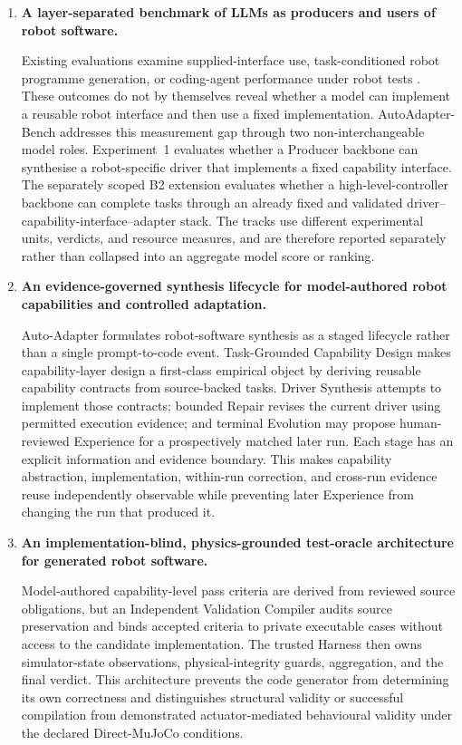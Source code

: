 \begin{enumerate}[leftmargin=*,itemsep=0.8em]

  \item \textbf{A layer-separated benchmark of LLMs as producers and users of
  robot software.}

  Existing evaluations examine supplied-interface use, task-conditioned robot
  programme generation, or coding-agent performance under robot tests
  \citep{liang2023codeaspolicies,hu2024codebotler,fu2026capx}. These outcomes do
  not by themselves reveal whether a model can implement a reusable robot
  interface and then use a fixed implementation. AutoAdapter-Bench addresses
  this measurement gap through two non-interchangeable model roles.
  Experiment~1 evaluates whether a Producer backbone can synthesise a
  robot-specific driver that implements a fixed capability interface. The
  separately scoped B2 extension evaluates whether a high-level-controller
  backbone can complete tasks through an already fixed and validated
  driver--capability-interface--adapter stack. The tracks use different
  experimental units, verdicts, and resource measures, and are therefore
  reported separately rather than collapsed into an aggregate model score or
  ranking.

  \item \textbf{An evidence-governed synthesis lifecycle for model-authored
  robot capabilities and controlled adaptation.}

  Auto-Adapter formulates robot-software synthesis as a staged lifecycle rather
  than a single prompt-to-code event. Task-Grounded Capability Design makes
  capability-layer design a first-class empirical object by deriving reusable
  capability contracts from source-backed tasks. Driver Synthesis attempts to
  implement those contracts; bounded Repair revises the current driver using
  permitted execution evidence; and terminal Evolution may propose
  human-reviewed Experience for a prospectively matched later run. Each stage
  has an explicit information and evidence boundary. This makes capability
  abstraction, implementation, within-run correction, and cross-run evidence
  reuse independently observable while preventing later Experience from
  changing the run that produced it.

  \item \textbf{An implementation-blind, physics-grounded test-oracle
  architecture for generated robot software.}

  Model-authored capability-level pass criteria are derived from reviewed
  source obligations, but an Independent Validation Compiler audits source
  preservation and binds accepted criteria to private executable cases without
  access to the candidate implementation. The trusted Harness then owns
  simulator-state observations, physical-integrity guards, aggregation, and the
  final verdict. This architecture prevents the code generator from determining
  its own correctness and distinguishes structural validity or successful
  compilation from demonstrated actuator-mediated behavioural validity under
  the declared Direct-MuJoCo conditions.

\end{enumerate}

